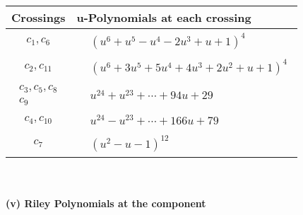 \documentclass[1p]{elsarticle_modified}
\theoremstyle{definition}
\begin{document}
\begin{tabular}{m{50pt}|m{274pt}}
Crossings & \hspace{64pt}u-Polynomials at each crossing \\
\hline $$\begin{aligned}c_{1},c_{6}\end{aligned}$$&$\begin{aligned}
&(u^6+u^5- u^4-2 u^3+u+1)^4
\end{aligned}$\\
\hline $$\begin{aligned}c_{2},c_{11}\end{aligned}$$&$\begin{aligned}
&(u^6+3 u^5+5 u^4+4 u^3+2 u^2+u+1)^4
\end{aligned}$\\
\hline $$\begin{aligned}c_{3},c_{5},c_{8}\\c_{9}\end{aligned}$$&$\begin{aligned}
&u^{24}+u^{23}+\cdots+94 u+29
\end{aligned}$\\
\hline $$\begin{aligned}c_{4},c_{10}\end{aligned}$$&$\begin{aligned}
&u^{24}- u^{23}+\cdots+166 u+79
\end{aligned}$\\
\hline $$\begin{aligned}c_{7}\end{aligned}$$&$\begin{aligned}
&(u^2- u-1)^{12}
\end{aligned}$\\
\hline
\end{tabular}\\~\\
\newpage\renewcommand{\arraystretch}{1}
\flushleft \textbf{(v) Riley Polynomials at the component}\newline \\
\end{document}

